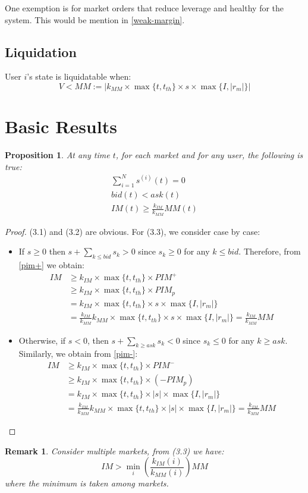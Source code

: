 \documentclass[notitlepage,reqno,11pt]{amsart}
\numberwithin{equation}{section}
\newtheorem{prop}{Proposition}[section]
\newtheorem{remark}{Remark}[section]
\begin{document}
One exemption is for market orders that reduce leverage and healthy for the system. This would be mention in \ref{weak-margin}.


\subsection{Liquidation}
User $i$'s state is liquidatable when:
$$
V <  MM := |k_{MM}\times \max\{t,t_{th}\}\times s\times\max\{{I,|r_m|}\}|
$$

\section{Basic Results}

\begin{prop}
    At any time $t$, for each market and for any user, the following is true:
    \begin{align}
    \sum_{i=1}^N s^{(i)}(t) = 0\\
        bid(t) < ask(t)\\
        IM(t) \geq \frac{k_{IM}}{k_{MM}} MM(t)
    \end{align}
\end{prop}
\begin{proof}
    (3.1) and (3.2) are obvious. For (3.3), we consider case by case:
    \begin{itemize}
        \item If $s \geq 0$ then $s + \sum_{k\leq bid}s_k >0$ since $s_k \geq 0$ for any $k\leq bid$. Therefore, from \eqref{pim+} we obtain:
        \begin{align*}
            IM &\geq k_{IM}\times \max\{t,t_{th}\}\times PIM^+\\
            &\geq k_{IM}\times \max\{t,t_{th}\}\times PIM_p\\
            &= k_{IM}\times \max\{t,t_{th}\}\times s\times\max\{I,|r_m|\}\\
            &=\frac{k_{IM}}{k_{MM}} k_{MM}\times \max\{t,t_{th}\}\times s\times\max\{I,|r_m|\} = \frac{k_{IM}}{k_{MM}}MM
        \end{align*}

        \item Otherwise, if $s < 0$, then $s + \sum_{k\geq ask}s_k <0$ since $s_k \leq 0$ for any $k\geq ask$. Similarly, we obtain from \eqref{pim-}:
        \begin{align*}
            IM &\geq k_{IM}\times \max\{t,t_{th}\}\times PIM^-\\
            &\geq k_{IM}\times \max\{t,t_{th}\}\times (-PIM_p)\\
            &= k_{IM}\times \max\{t,t_{th}\}\times |s|\times\max\{I,|r_m|\}\\
            &=\frac{k_{IM}}{k_{MM}} k_{MM}\times \max\{t,t_{th}\}\times |s|\times\max\{I,|r_m|\} = \frac{k_{IM}}{k_{MM}} MM
        \end{align*}
    \end{itemize}
\end{proof}
\begin{remark}
    Consider multiple markets, from (3.3) we have: 
    $$
    IM > \min_i(\frac{k_{IM}(i)}{k_{MM}(i)}) MM
    $$
    where the minimum is taken among markets. 
\end{remark}
\end{document}
